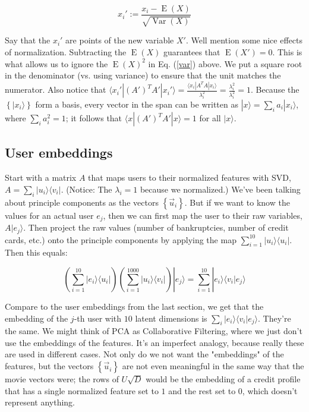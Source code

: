 \documentclass{amsbook}
\begin{document}
$$
x_i':=\frac{x_i-\operatorname{E}(X)}{\sqrt{\operatorname{Var}(X)}}
$$

Say that the $x_i'$ are points of the new variable $X'$.  Well mention some nice effects of normalization.  Subtracting the $\operatorname{E}(X)$ guarantees that $\operatorname{E}(X')=0$.  This is what allows us to ignore the $\operatorname{E}(X)^2$ in Eq. (\ref{var}) above.  We put a square root in the denominator (vs. using variance) to ensure that the unit matches the numerator.  Also notice that $\langle x_i'|(A')^TA'|x_i'\rangle=\frac{\langle x_i|A^TA|x_i\rangle}{\lambda_i^2} = \frac{\lambda_i^2}{\lambda_i^2}=1$.  Because the $\left\{|x_i\rangle\right\}$ form a basis, every vector in the span can be written as $|x\rangle=\sum_ia_i|x_i\rangle$, where $\sum_ia_i^2=1$; it follows that $\langle x|(A')^TA'|x\rangle=1$ for all $|x\rangle$.

\subsection{User embeddings}

Start with a matrix $A$ that maps users to their normalized features with SVD, $A=\sum_i|u_i\rangle\langle v_i|$.  (Notice:  The $\lambda_i=1$ because we normalized.)  We've been talking about principle components as the vectors $\left\{\vec u_i\right\}$.  But if we want to know the values for an actual user $e_j$, then we can first map the user to their raw variables, $A|e_j\rangle$.  Then project the raw values (number of bankruptcies, number of credit cards, etc.) onto the principle components by applying the map $\sum_{i=1}^{10}|u_i\rangle\langle u_i|$.  Then this equals:

$$
\left(\sum_{i=1}^{10}|e_i\rangle\langle u_i|\right)\left(\sum_{i=1}^{1000}|u_i\rangle\langle v_i|\right)|e_j\rangle = \sum_{i=1}^{10}|e_i\rangle\langle v_i|e_j\rangle
$$

Compare to the user embeddings from the last section, we get that the embedding of the $j$-th user with $10$ latent dimensions is $\sum_i|e_i\rangle\langle v_i|e_j\rangle$.  They're the same.  We might think of PCA as Collaborative Filtering, where we just don't use the embeddings of the features.  It's an imperfect analogy, because really these are used in different cases.  Not only do we not want the "embeddings" of the features, but the vectors $\left\{\vec u_i\right\}$ are not even meaningful in the same way that the movie vectors were; the rows of $U\sqrt D$ would be the embedding of a credit profile that has a single normalized feature set to $1$ and the rest set to $0$, which doesn't represent anything.
\end{document}
